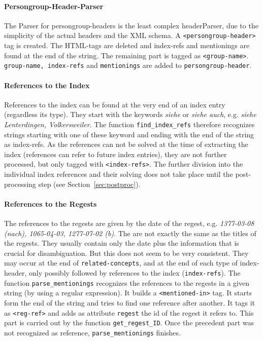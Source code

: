 \paragraph{Persongroup-Header-Parser}
The Parser for persongroup-headers is the least complex headerParser, due to the simplicity of the actual headers and the XML schema. A \texttt{<persongroup-header>} tag is created. The HTML-tags are deleted and index-refs and mentionings are found at the end of the string. The remaining part is tagged as \texttt{<group-name>}. \texttt{group-name, index-refs} and \texttt{mentionings} are added to \texttt{persongroup-header}.

\paragraph{References to the Index}
\label{sec:index-refs}
References to the index can be found at the very end of an index entry (regardless its type). They start with the keywords \textit{siehe} or \textit{siehe auch}, e.g. \textit{siehe Lenterdingen, Volkersweiler}. The function \texttt{find\_index\_refs} therefore recognizes strings starting with one of these keyword and ending with the end of the string as index-refs. As the references can not be solved at the time of extracting the index (references can refer to future index entries), they are not further processed, but only tagged with \texttt{<index-refs>}. The further division into the individual index references and their solving does not take place until the post-processing step (see Section~\ref{sec:postproc}).

\paragraph{References to the Regests}
\label{sec:reg-refs}
The references to the regests are given by the date of the regest, e.g. \textit{1377-03-08 (nach), 1065-04-03, 1277-07-02 (b)}. The are not exactly the same as the titles of the regests. They usually contain only the date plus the information that is crucial for disambiguation. But this does not seem to be very consistent. They may occur at the end of \texttt{related-concepts}, and at the end of each type of index-header, only possibly followed by references to the index (\texttt{index-refs}).
The function \texttt{parse\_mentionings} recognizes the references to the regests in a given string (by using a regular expression). It builds a \texttt{<mentioned-in>} tag. It starts form the end of the string and tries to find one reference after another. It tags it as \texttt{<reg-ref>} and adds as attribute \texttt{regest} the id of the regest it refers to. This part is carried out by the function \texttt{get\_regest\_ID}. Once the precedent part was not recognized as reference, \texttt{parse\_mentionings} finishes.


